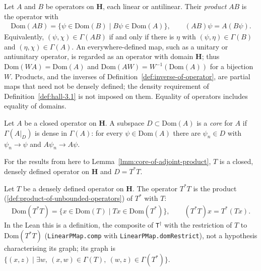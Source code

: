 \begin{definition}
    \label{def:product-of-unbounded-operators}
    \leanok
    Let $A$ and $B$ be operators on $\mathbf{H}$, each linear or antilinear. Their \emph{product} $AB$ is the operator with
    \begin{align}
        \text{Dom}(AB) = \{ \psi \in \text{Dom}(B) \mid B\psi \in \text{Dom}(A) \}, \qquad (AB)\psi = A(B\psi).
    \end{align}
    Equivalently, $(\psi, \chi) \in \Gamma(AB)$ if and only if there is $\eta$ with $(\psi, \eta) \in \Gamma(B)$ and $(\eta, \chi) \in \Gamma(A)$. An everywhere-defined map, such as a unitary or antiunitary operator, is regarded as an operator with domain $\mathbf{H}$; thus $\text{Dom}(WA) = \text{Dom}(A)$ and $\text{Dom}(AW) = W^{-1}(\text{Dom}(A))$ for a bijection $W$. Products, and the inverses of Definition~\ref{def:inverse-of-operator}, are partial maps that need not be densely defined; the density requirement of Definition~\ref{def:hall-3.1} is not imposed on them. Equality of operators includes equality of domains.
\end{definition}

\begin{definition}[Core]
    \label{def:core}
    \leanok
    Let $A$ be a closed operator on $\mathbf{H}$. A subspace $D \subset \text{Dom}(A)$ is a \emph{core} for $A$ if $\Gamma(A\vert_D)$ is dense in $\Gamma(A)$: for every $\psi \in \text{Dom}(A)$ there are $\psi_n \in D$ with $\psi_n \to \psi$ and $A\psi_n \to A\psi$.
\end{definition}

For the results from here to Lemma~\ref{lmm:core-of-adjoint-product}, $T$ is a closed, densely defined operator on $\mathbf{H}$ and $D = T^*T$.

\begin{definition}
    \label{def:adjoint-product-operator}
    \leanok
    Let $T$ be a densely defined operator on $\mathbf{H}$. The operator $T^*T$ is the product (\ref{def:product-of-unbounded-operators}) of $T^*$ with $T$:
    \begin{align}
        \text{Dom}(T^*T) = \{ x \in \text{Dom}(T) \mid Tx \in \text{Dom}(T^*) \}, \qquad (T^*T)x = T^*(Tx).
    \end{align}
    In the Lean this is a definition, the composite of \texttt{T\ensuremath{^\dagger}} with the restriction of $T$ to $\text{Dom}(T^*T)$ (\texttt{LinearPMap.comp} with \texttt{LinearPMap.domRestrict}), not a hypothesis characterising its graph; its graph is $\{(x, z) \mid \exists w,\ (x, w) \in \Gamma(T),\ (w, z) \in \Gamma(T^*)\}$.
\end{definition}

